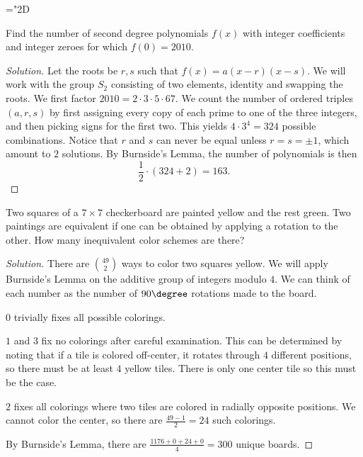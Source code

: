 \mathchardef\mh="2D

\begin{prb}[2010 AIME II-10]
Find the number of second degree polynomials $f(x)$ with integer coefficients
and integer zeroes for which $f(0) = 2010$.
\end{prb}

\ifsolutions
\begin{proof}[Solution]
Let the roots be $r, s$ such that $f(x) = a(x - r)(x - s)$. We will work with
the group $S_2$ consisting of two elements, identity and swapping the roots. We
first factor $2010 = 2 \cdot 3 \cdot 5 \cdot 67$. We count the number of ordered
triples $(a, r, s)$ by first assigning every copy of each prime to one of the
three integers, and then picking signs for the first two. This yields $4 \cdot
3^4 = 324$ possible combinations. Notice that $r$ and $s$ can never be equal
unless $r = s = \pm 1$, which amount to $2$ solutions. By Burnside's Lemma, the
number of polynomials is then
\[ \frac{1}{2} \cdot (324 + 2) = \boxed{163}. \]
\end{proof}
\fi

\begin{prb}[1996 AIME]
Two squares of a $7 \times 7$ checkerboard are painted yellow and the rest
green. Two paintings are equivalent if one can be obtained by applying a
rotation to the other. How many inequivalent color schemes are there?
\end{prb}

\ifsolutions
\begin{proof}[Solution]
There are $\binom{49}{2}$ ways to color two squares yellow. We will apply
Burnside's Lemma on the additive group of integers modulo $4$. We can think of
each number as the number of $90 \degree$ rotations made to the board.

$0$ trivially fixes all possible colorings.

$1$ and $3$ fix no colorings after careful examination. This can be determined
by noting that if a tile is colored off-center, it rotates through $4$ different
positions, so there must be at least $4$ yellow tiles. There is only one center
tile so this must be the case.

$2$ fixes all colorings where two tiles are colored in radially opposite
positions. We cannot color the center, so there are $\frac{49 - 1}{2} = 24$ such
colorings.

By Burnside's Lemma, there are $\frac{1176 + 0 + 24 + 0}{4} = \boxed{300}$
unique boards.
\end{proof}
\fi

